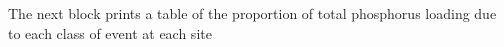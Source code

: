 \documentclass[12pt]{article}
\begin{document}













The next block prints a table of the proportion of total phosphorus loading due to each class of event at each site\\
\end{document}
